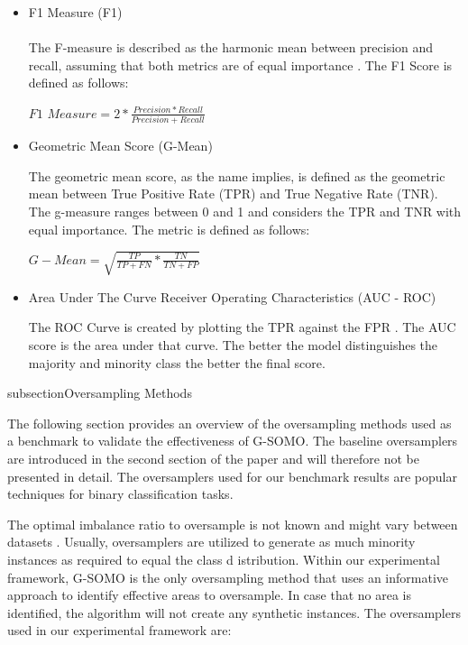\documentclass[parskip=full]{scrartcl}
\begin{document}
\begin{itemize}
  \item F1 Measure (F1) \\
  \\
  The F-measure is described as the harmonic mean between precision and recall, assuming that both metrics 
  are of equal importance \cite{Guo2018}. The F1 Score is defined as follows:
  
  \begin{center} $F1$  $Measure= 2 * \frac{Precision * Recall}{Precision + Recall}$ \end{center}
    
  \item Geometric Mean Score (G-Mean)
  
  The geometric mean score, as the name implies, is defined as the geometric mean between True Positive Rate 
  (TPR) and True Negative Rate (TNR). The g-measure ranges between 0 and 1 and considers the TPR and TNR 
  with equal importance. The metric is defined as follows:
  
   \begin{center} $G-Mean=  \sqrt{\frac{TP}{TP + FN} * \frac{TN}{TN + FP}}$ \end{center}
  
  \item Area Under The Curve Receiver Operating Characteristics (AUC - ROC)
  
  The ROC Curve is created by plotting the TPR against the FPR \cite{Hand2009}. The AUC score is the 
  area under that curve. The better the model distinguishes the majority and minority class the better 
  the final score. 

\end{itemize}

subsection{Oversampling Methods}

The following section provides an overview of the oversampling methods used as a benchmark to validate 
the effectiveness of G-SOMO. The baseline oversamplers are introduced in the second section of the paper 
and will therefore not be presented in detail. The oversamplers used for our benchmark results are 
popular techniques for binary classification tasks.

The optimal imbalance ratio to oversample is not known and might vary between datasets \cite{Provost2018}. 
Usually, oversamplers are utilized to generate as much minority instances as required to equal the class d
istribution. Within our experimental framework, G-SOMO is the only oversampling method that uses an 
informative approach to identify effective areas to oversample. In case that no area is identified, 
the algorithm will not create any synthetic instances. The oversamplers used in our experimental 
framework are:
\end{document}
